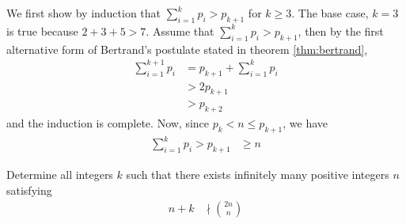 \documentclass{subfile}
\begin{document}
	\begin{solution}
		We first show by induction that $\sum_{i=1}^{k} p_i > p_{k+1}$ for $k \geq 3$. The base case, $k=3$ is true because $2+3+5>7$. Assume that $\sum_{i=1}^{k} p_i > p_{k+1}$, then by the first alternative form of Bertrand's postulate stated in theorem \autoref{thm:bertrand},
			\begin{align*}
				\sum_{i=1}^{k+1} p_i
					& = p_{k+1} + \sum_{i=1}^k p_i\\
					& > 2p_{k+1}\\
					& > p_{k+2}
			\end{align*}
		and the induction is complete. Now, since $p_k<n\leq p_{k+1}$, we have
			\begin{align*}
				\sum_{i=1}^k p_i > p_{k+1}
					& \geq n
			\end{align*}
	\end{solution}

	\begin{problem}[China 2015]\label{prob:china2015-bertrand}
		Determine all integers $k$ such that there exists infinitely many positive integers $n$ satisfying
		\begin{align*}
		n+k
			& \nmid \binom{2n}{n}
		\end{align*}
	\end{problem}
\end{document}
